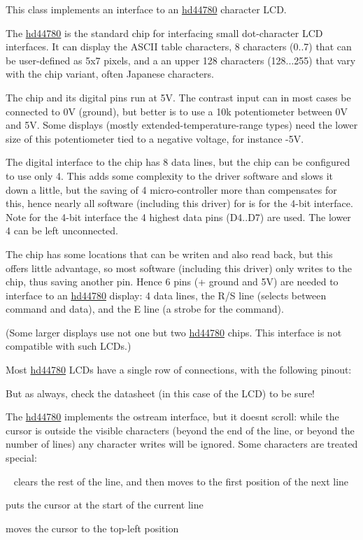 This class implements an interface to an \hyperlink{classhwlib_1_1hd44780}{hd44780} character L\+CD.



The \hyperlink{classhwlib_1_1hd44780}{hd44780} is the standard chip for interfacing small dot-\/character L\+CD interfaces. It can display the A\+S\+C\+II table characters, 8 characters (0..7) that can be user-\/defined as 5x7 pixels, and a an upper 128 characters (128...255) that vary with the chip variant, often Japanese characters.

The chip and its digital pins run at 5V. The contrast input can in most cases be connected to 0V (ground), but better is to use a 10k potentiometer between 0V and 5V. Some displays (mostly extended-\/temperature-\/range types) need the lower size of this potentiometer tied to a negative voltage, for instance -\/5V.

The digital interface to the chip has 8 data lines, but the chip can be configured to use only 4. This adds some complexity to the driver software and slows it down a little, but the saving of 4 micro-\/controller more than compensates for this, hence nearly all software (including this driver) for is for the 4-\/bit interface. Note for the 4-\/bit interface the 4 highest data pins (D4..D7) are used. The lower 4 can be left unconnected.

The chip has some locations that can be writen and also read back, but this offers little advantage, so most software (including this driver) only writes to the chip, thus saving another pin. Hence 6 pins (+ ground and 5V) are needed to interface to an \hyperlink{classhwlib_1_1hd44780}{hd44780} display\+: 4 data lines, the R/S line (selects between command and data), and the E line (a strobe for the command).



(Some larger displays use not one but two \hyperlink{classhwlib_1_1hd44780}{hd44780} chips. This interface is not compatible with such L\+C\+Ds.)

Most \hyperlink{classhwlib_1_1hd44780}{hd44780} L\+C\+Ds have a single row of connections, with the following pinout\+:



But as always, check the datasheet (in this case of the L\+CD) to be sure!

The \hyperlink{classhwlib_1_1hd44780}{hd44780} implements the ostream interface, but it doesn\textquotesingle{}t scroll\+: while the cursor is outside the visible characters (beyond the end of the line, or beyond the number of lines) any character writes will be ignored. Some characters are treated special\+:
\begin{DoxyItemize}
\item \textquotesingle{}~\newline
\textquotesingle{} clears the rest of the line, and then moves to the first position of the next line
\item \textquotesingle{}\textquotesingle{} puts the cursor at the start of the current line
\item \textquotesingle{}{\ttfamily }\textquotesingle{} moves the cursor to the top-\/left position
\end{DoxyItemize}

